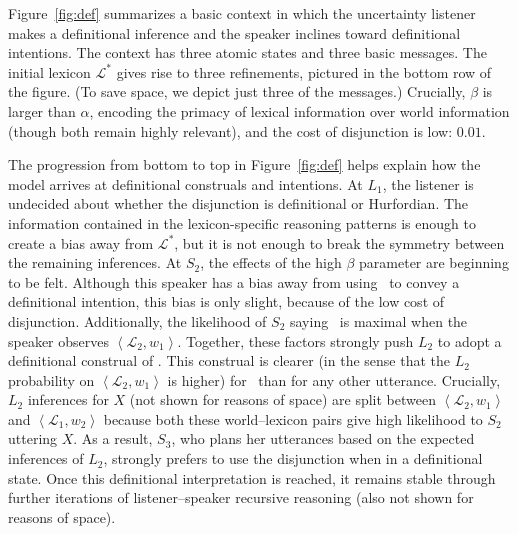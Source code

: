 \documentclass[12pt,twoside]{article}
\newcommand{\Figref}[1]{Figure~\ref{#1}}
\newcommand{\figref}[1]{Figure~\ref{#1}}
\newcommand{\tuple}[1]{\ensuremath{\left< #1 \right>}}
\newcommand{\Lex}{\mathcal{L}}
\newcommand{\LexStar}{\Lex^{\ast}}
\newcommand{\SpeakerK}[1][k]{S_{#1}}
\newcommand{\ListenerK}[1][k]{L_{#1}}
\renewcommand{\_}{\textbf{\textunderscore\hspace{-4pt}\textunderscore\hspace{-3pt}\textunderscore\hspace{-4pt}\textunderscore}\hspace{0.5pt}}			%
\begin{document}
\Figref{fig:def} summarizes a basic context in which the uncertainty
listener makes a definitional inference and the speaker inclines
toward definitional intentions. The context has three atomic states
and three basic messages. The initial lexicon $\LexStar$ gives rise to
three refinements, pictured in the bottom row of the figure. (To save
space, we depict just three of the messages.)  Crucially, $\beta$ is
larger than $\alpha$, encoding the primacy of lexical information over
world information (though both remain highly relevant), and the cost
of disjunction is low: $0.01$.

The progression from bottom to top in \figref{fig:def} helps explain
how the model arrives at definitional construals and intentions.  At
$\ListenerK[1]$, the listener is undecided about whether the
disjunction is definitional or Hurfordian. The information contained
in the lexicon-specific reasoning patterns is enough to create a bias
away from $\LexStar$, but it is not enough to break the symmetry
between the remaining inferences. At $\SpeakerK[2]$, the effects of
the high $\beta$ parameter are beginning to be felt. Although this
speaker has a bias away from using \AorX\ to convey a definitional
intention, this bias is only slight, because of the low cost of
disjunction.  Additionally, the likelihood of $\SpeakerK[2]$ saying
\AorX\ is maximal when the speaker observes $\tuple{\Lex_{2},
  w_{1}}$. Together, these factors strongly push $\ListenerK[2]$ to
adopt a definitional construal of \AorX.  This construal is clearer
(in the sense that the $\ListenerK[2]$ probability on
$\tuple{\Lex_{2}, w_{1}}$ is higher) for \AorX\ than for any other
utterance. Crucially, $\ListenerK[2]$ inferences for $X$ (not shown
for reasons of space) are split between $\tuple{\Lex_{2}, w_{1}}$ and
$\tuple{\Lex_{1}, w_{2}}$ because both these world--lexicon pairs give
high likelihood to $\SpeakerK[2]$ uttering $X$.  As a result,
$\SpeakerK[3]$, who plans her utterances based on the expected
inferences of $\ListenerK[2]$, strongly prefers to use the disjunction
when in a definitional state.  Once this definitional interpretation
is reached, it remains stable through further iterations of
listener--speaker recursive reasoning (also not shown for reasons of
space).
\end{document}
